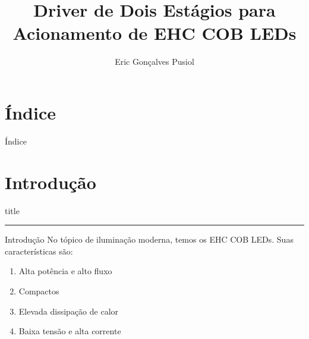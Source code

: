 \documentclass{beamer}
\title{Driver de Dois Estágios para Acionamento	de EHC COB LEDs}
\author{Eric Gonçalves Pusiol}
\institute{UFJF}
\date{} %
\begin{document}
{ 
\frame{\titlepage}}

\section*{Índice}\begin{frame}{Índice}\tableofcontents\end{frame}

\section{Introdução}
\begin{frame}[plain]
	\vfill
	\centering
	\begin{beamercolorbox}[sep=8pt,center,shadow=true,rounded=true]{title}
		\insertsectionhead\par%
		\color{oxfordblue}\noindent\rule{10cm}{1pt}
	\end{beamercolorbox}
	\vfill
\end{frame}
\begin{frame}{Introdução}
	No tópico de iluminação moderna, temos os EHC COB LEDs. Suas características são:

	\begin{enumerate}
		\item Alta potência e alto fluxo
		\item Compactos
		\item Elevada dissipação de calor
		\item Baixa tensão e alta corrente
	\end{enumerate}
\end{frame}
\end{document}

